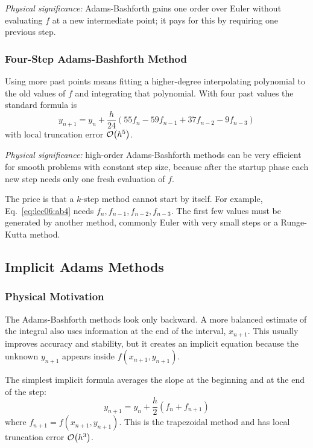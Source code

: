 \textit{Physical significance:} Adams-Bashforth gains one order over Euler
without evaluating $f$ at a new intermediate point; it pays for this by
requiring one previous step.

\subsubsection{Four-Step Adams-Bashforth Method}
Using more past points means fitting a higher-degree interpolating polynomial
to the old values of $f$ and integrating that polynomial. With four past
values the standard formula is
\begin{equation}
    \boxed{
    y_{n+1}
    =y_n+\frac{h}{24}\left(
    55f_n-59f_{n-1}+37f_{n-2}-9f_{n-3}
    \right)}
    \label{eq:lec06:ab4}
\end{equation}
with local truncation error $\mathcal{O}\!\left(h^5\right)$.

\textit{Physical significance:} high-order Adams-Bashforth methods can be
very efficient for smooth problems with constant step size, because after the
startup phase each new step needs only one fresh evaluation of $f$.

The price is that a $k$-step method cannot start by itself. For example,
Eq.~\eqref{eq:lec06:ab4} needs $f_n,f_{n-1},f_{n-2},f_{n-3}$. The first few
values must be generated by another method, commonly Euler with very small
steps or a Runge-Kutta method.

\subsection{Implicit Adams Methods}
\label{subsec:lec06:adams-moulton}

\subsubsection*{Physical Motivation}
The Adams-Bashforth methods look only backward. A more balanced estimate of
the integral also uses information at the end of the interval,
$x_{n+1}$. This usually improves accuracy and stability, but it creates an
implicit equation because the unknown $y_{n+1}$ appears inside
$f(x_{n+1},y_{n+1})$.

The simplest implicit formula averages the slope at the beginning and at the
end of the step:
\begin{equation}
    \boxed{
    y_{n+1}
    =y_n+\frac{h}{2}\left(f_n+f_{n+1}\right)}
    \label{eq:lec06:trapezoidal-method}
\end{equation}
where $f_{n+1}=f(x_{n+1},y_{n+1})$. This is the trapezoidal method and has
local truncation error $\mathcal{O}\!\left(h^3\right)$.

